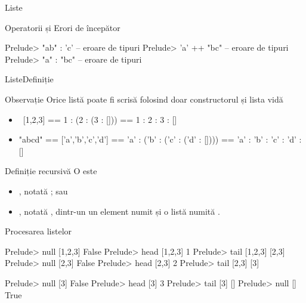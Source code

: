 \documentclass[xcolor=pdftex,romanian,colorlinks]{beamer}
\begin{document}
\begin{section}{Liste}
\begin{frame}[fragile]{Operatorii \structure{:} și \structure{++}}{Erori de începător}
\begin{minipage}[t]{.49\columnwidth}
\end{minipage}
\begin{minipage}[t]{.49\columnwidth}
\begin{asciihs}
Prelude> "ab" : 'c'
  -- eroare de tipuri
Prelude> 'a' ++ "bc"
  -- eroare de tipuri
Prelude> "a" : "bc"
  -- eroare de tipuri
\end{asciihs}

\end{minipage}
\end{frame}

\begin{frame}{Liste}{Definiție}
\begin{block}
{Observație}
Orice listă poate fi scrisă folosind doar constructorul \structure{(:)} și lista vidă \structure{[]}
\begin{itemize}
\item\ [1,2,3] == 1 : (2 : (3 : [])) == 1 : 2 : 3 : []
\item "abcd" == ['a','b','c','d'] == 'a' : ('b' : ('c' : ('d' : []))) == 'a' : 'b' : 'c' : 'd' : []
\end{itemize}
\end{block}
\vfill
\begin{block}{Definiție recursivă}
O  este
\begin{itemize}
\item {}, notată \structure{[]}; sau
\item {}, notată , dintr-un un element  numit  și o listă  numită .
\end{itemize}
\end{block}
\vfill
\end{frame}

\begin{frame}[fragile]{Procesarea listelor}

\begin{minipage}[b]{.49\columnwidth}
\begin{asciihs}
Prelude> null [1,2,3]
False
Prelude> head [1,2,3]
1
Prelude> tail [1,2,3]
[2,3]
Prelude> null [2,3]
False
Prelude> head [2,3]
2
Prelude> tail [2,3]
[3]
\end{asciihs}
\end{minipage}
\begin{minipage}{.49\columnwidth}
\begin{asciihs}
Prelude> null [3]
False
Prelude> head [3]
3
Prelude> tail [3]
[]
Prelude> null []
True
\end{asciihs}
\end{minipage}
\end{frame}

\end{section}
\end{document}
